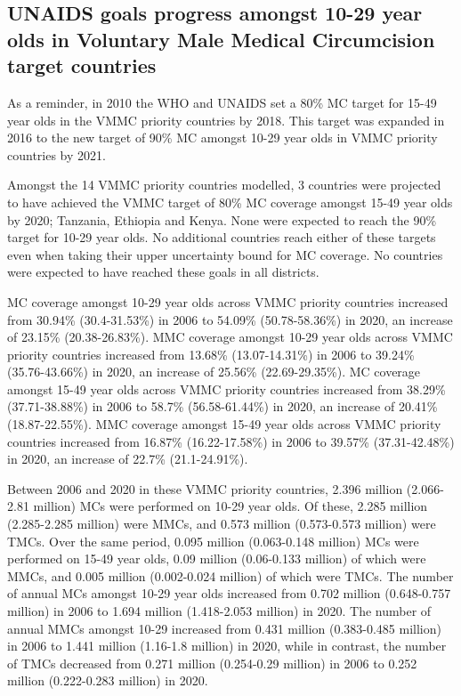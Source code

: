 \documentclass{article}
\begin{document}
\subsection{UNAIDS goals progress amongst 10-29 year olds in Voluntary Male Medical Circumcision target countries}
\label{sec:orgf9204d9}

As a reminder, in 2010 the WHO and UNAIDS set a 80\% MC target for 15-49
year olds in the VMMC priority countries by 2018. This target was
expanded in 2016 to the new target of 90\% MC amongst 10-29 year olds in
VMMC priority countries by 2021.

Amongst the 14 VMMC priority countries modelled, 3 countries were
projected to have achieved the VMMC target of 80\% MC coverage amongst
15-49 year olds by 2020; Tanzania, Ethiopia and Kenya. None were
expected to reach the 90\% target for 10-29 year olds. No additional
countries reach either of these targets even when taking their upper
uncertainty bound for MC coverage. No countries were expected to have
reached these goals in all districts.

MC coverage amongst 10-29 year olds across VMMC priority countries
increased from 30.94\% (30.4-31.53\%) in 2006 to 54.09\% (50.78-58.36\%)
in 2020, an increase of 23.15\% (20.38-26.83\%). MMC coverage amongst
10-29 year olds across VMMC priority countries increased from 13.68\%
(13.07-14.31\%) in 2006 to 39.24\% (35.76-43.66\%) in 2020, an increase
of 25.56\% (22.69-29.35\%). MC coverage amongst 15-49 year olds across
VMMC priority countries increased from 38.29\% (37.71-38.88\%) in 2006
to 58.7\% (56.58-61.44\%) in 2020, an increase of 20.41\%
(18.87-22.55\%). MMC coverage amongst 15-49 year olds across VMMC
priority countries increased from 16.87\% (16.22-17.58\%) in 2006 to
39.57\% (37.31-42.48\%) in 2020, an increase of 22.7\% (21.1-24.91\%).

Between 2006 and 2020 in these VMMC priority countries, 2.396 million
(2.066-2.81 million) MCs were performed on 10-29 year olds. Of these,
2.285 million (2.285-2.285 million) were MMCs, and 0.573 million
(0.573-0.573 million) were TMCs. Over the same period, 0.095 million
(0.063-0.148 million) MCs were performed on 15-49 year olds, 0.09
million (0.06-0.133 million) of which were MMCs, and 0.005 million
(0.002-0.024 million) of which were TMCs. The number of annual MCs
amongst 10-29 year olds increased from 0.702 million (0.648-0.757
million) in 2006 to 1.694 million (1.418-2.053 million) in 2020. The
number of annual MMCs amongst 10-29 increased from 0.431 million
(0.383-0.485 million) in 2006 to 1.441 million (1.16-1.8 million) in
2020, while in contrast, the number of TMCs decreased from 0.271 million
(0.254-0.29 million) in 2006 to 0.252 million (0.222-0.283 million) in
2020.
\end{document}
